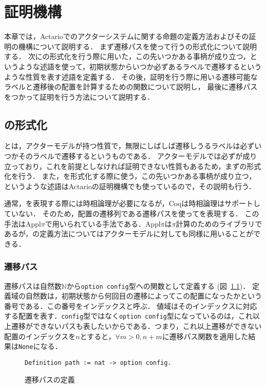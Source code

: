 \chapter{証明機構}
\label{chapter:proof}

本章では，Actarioでのアクターシステムに関する命題の定義方法およびその証明の機構について説明する．
まず遷移パスを使って行う\fairness の形式化について説明する．
次に\fairness の形式化を行う際に用いた，この先いつかある事柄が成り立つ，というような述語を使って，初期状態からいつか必ずあるラベルで遷移するというような性質を表す述語を定義する．
その後，証明を行う際に用いる遷移可能なラベルと遷移後の配置を計算するための関数について説明し，
最後に遷移パスをつかって証明を行う方法について説明する．

\section{\fairness の形式化}
\fairness とは，アクターモデルが持つ性質で，無限にしばしば遷移しうるラベルは必ずいつかそのラベルで遷移するというものである．
アクターモデルでは必ず\fairness が成り立っており，これを前提としなければ証明できない性質もあるため，まず\fairness の形式化を行う．
また，\fairness を形式化する際に使う，この先いつかある事柄が成り立つ，というような述語はActarioの証明機構でも使っているので，その説明も行う．

通常，\fairness を表現する際には時相論理が必要になるが，Coqは時相論理はサポートしていない．
そのため，配置の遷移列である遷移パスを使って\fairness を表現する．
この手法はAppl$\pi$\cite{}で用いられている手法である．Appl$\pi$は$\pi$計算のためのライブラリであるが，\fairness の定義方法についてはアクターモデルに対しても同様に用いることができる．

\subsection{遷移パス}
遷移パスは自然数$\mathbb{N}$から\texttt{option config}型への関数として定義する (図~\ref{code:formalization:path})．
定義域の自然数は，初期状態から何回目の遷移によってこの配置になったかという番号である．この番号をインデックスと呼ぶ．
値域はそのインデックスに対応する配置を表す．\texttt{config}型ではなく\texttt{option config}型になっているのは，これ以上遷移ができないパスも表したいからである．つまり，これ以上遷移ができない配置のインデックスを$n$とすると，$\forall m > 0, n + m$に遷移パス関数を適用した結果は\texttt{None}になる．

\begin{figure}[tp]
\begin{lstlisting}
Definition path := nat -> option config.
\end{lstlisting}
  \caption{遷移パスの定義}\label{code:formalization:path}
\end{figure}

